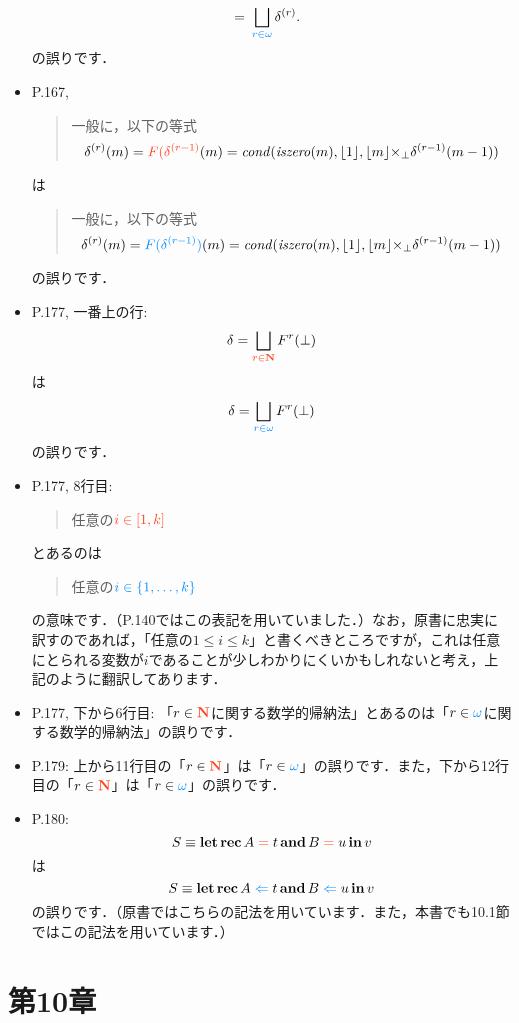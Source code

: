 \documentclass[12pt,titlepage,twoside,openright,dvipdfmx]{jsbook}
\newcommand\old[1]{%
  \textcolor[rgb]{1.0,0.25,0.1}{#1}%
  }
\newcommand\new[1]{%
  \textcolor[rgb]{0,0.55,1.0}{#1}%
  }
\theoremstyle{definition}
\begin{document}
\begin{itemize}
\begin{align*}
    ~=~ & \bigsqcup_{\new{r \in \omega}} \delta^{(r)}.
  \end{align*}
  の誤りです．
\item P.167,
  \begin{quote}
    一般に，以下の等式
    \[
      \delta^{(r)}(m) = \old{F(\delta^{(r-1)}}(m) = \SEMCOND(\ISZERO(m),\valuize{1},\valuize{m} \strict{\times} \delta^{(r-1)}(m-1))\\
    \]
  \end{quote}
  は
  \begin{quote}
    一般に，以下の等式
    \[
      \delta^{(r)}(m) = \new{F(\delta^{(r-1)})}(m) = \SEMCOND(\ISZERO(m),\valuize{1},\valuize{m} \strict{\times} \delta^{(r-1)}(m-1))\\
    \]
  \end{quote}
  の誤りです．
\item P.177, 一番上の行:
  \[
    \delta = \bigsqcup_{\old{r \in \NUM}} F^r(\bot)
  \]
  は
  \[
    \delta = \bigsqcup_{\new{r \in \omega}} F^r(\bot)
  \]
  の誤りです．
\item P.177, 8行目:
  \begin{quote}
    任意の$\old{i \in [1,k]}$
  \end{quote}
  とあるのは
  \begin{quote}
    任意の$\new{i \in \set{1,\dots,k}}$
  \end{quote}
  の意味です．（P.140ではこの表記を用いていました．）なお，原書に忠実に訳すのであれば，「任意の$1 \le i \le k$」と書くべきところですが，これは任意にとられる変数が$i$であることが少しわかりにくいかもしれないと考え，上記のように翻訳してあります．
\item P.177, 下から6行目:
  「$r \in \old{\NUM}$に関する数学的帰納法」とあるのは「$r \in \new{\omega}$に関する数学的帰納法」の誤りです．
\item P.179:
  上から11行目の「$r \in \old{\NUM}$」は「$r \in \new{\omega}$」の誤りです．また，下から12行目の「$r \in \old{\NUM}$」は「$r \in \new{\omega}$」の誤りです．
\item P.180:
  \[
    S \equiv \BFLET \BFREC A \old{{}={}} t \BFAND B \old{{}={}} u \BFIN v
  \]
  は
  \[
    S \equiv \BFLET \BFREC A \new{{}\Leftarrow{}} t \BFAND B \new{{}\Leftarrow{}} u \BFIN v
  \]
  の誤りです．（原書ではこちらの記法を用いています．また，本書でも10.1節ではこの記法を用いています．）
\end{itemize}

\section*{第10章}
\end{document}
